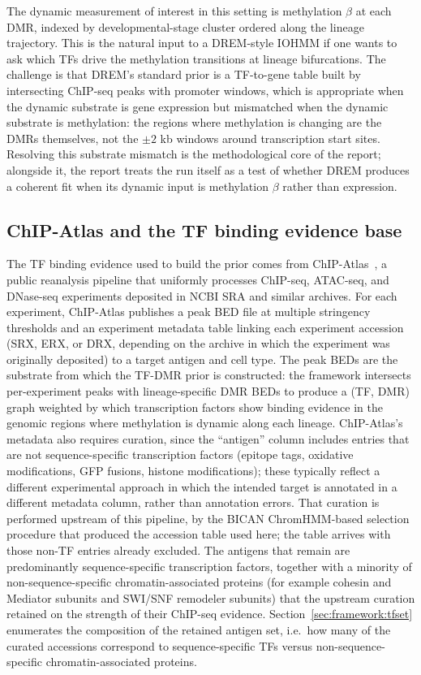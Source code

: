 The dynamic measurement of interest in this setting is methylation $\beta$ at each DMR, indexed by developmental-stage cluster ordered along the lineage trajectory. This is the natural input to a DREM-style IOHMM if one wants to ask which TFs drive the methylation transitions at lineage bifurcations. The challenge is that DREM's standard prior is a TF-to-gene table built by intersecting ChIP-seq peaks with promoter windows, which is appropriate when the dynamic substrate is gene expression but mismatched when the dynamic substrate is methylation: the regions where methylation is changing are the DMRs themselves, not the $\pm 2$ kb windows around transcription start sites. Resolving this substrate mismatch is the methodological core of the report; alongside it, the report treats the run itself as a test of whether DREM produces a coherent fit when its dynamic input is methylation $\beta$ rather than expression.

\subsection{ChIP-Atlas and the TF binding evidence base}

The TF binding evidence used to build the prior comes from ChIP-Atlas~\cite{oki2018chipatlas}, a public reanalysis pipeline that uniformly processes ChIP-seq, ATAC-seq, and DNase-seq experiments deposited in NCBI SRA and similar archives. For each experiment, ChIP-Atlas publishes a peak BED file at multiple stringency thresholds and an experiment metadata table linking each experiment accession (SRX, ERX, or DRX, depending on the archive in which the experiment was originally deposited) to a target antigen and cell type. The peak BEDs are the substrate from which the TF-DMR prior is constructed: the framework intersects per-experiment peaks with lineage-specific DMR BEDs to produce a (TF, DMR) graph weighted by which transcription factors show binding evidence in the genomic regions where methylation is dynamic along each lineage. ChIP-Atlas's metadata also requires curation, since the ``antigen'' column includes entries that are not sequence-specific transcription factors (epitope tags, oxidative modifications, GFP fusions, histone modifications); these typically reflect a different experimental approach in which the intended target is annotated in a different metadata column, rather than annotation errors. That curation is performed upstream of this pipeline, by the BICAN ChromHMM-based selection procedure that produced the accession table used here; the table arrives with those non-TF entries already excluded. The antigens that remain are predominantly sequence-specific transcription factors, together with a minority of non-sequence-specific chromatin-associated proteins (for example cohesin and Mediator subunits and SWI/SNF remodeler subunits) that the upstream curation retained on the strength of their ChIP-seq evidence. Section~\ref{sec:framework:tfset} enumerates the composition of the retained antigen set, i.e.\ how many of the curated accessions correspond to sequence-specific TFs versus non-sequence-specific chromatin-associated proteins.


